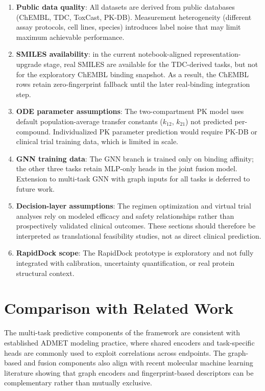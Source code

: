 \documentclass[a4paper,11pt,twoside]{report}
\begin{document}
\begin{enumerate}
  \item \textbf{Public data quality}: All datasets are derived from public databases (ChEMBL, TDC, ToxCast, PK-DB). Measurement heterogeneity (different assay protocols, cell lines, species) introduces label noise that may limit maximum achievable performance.
  \item \textbf{SMILES availability}: in the current notebook-aligned representation-upgrade stage, real SMILES are available for the TDC-derived tasks, but not for the exploratory ChEMBL binding snapshot. As a result, the ChEMBL rows retain zero-fingerprint fallback until the later real-binding integration step.
  \item \textbf{ODE parameter assumptions}: The two-compartment PK model uses default population-average transfer constants ($k_{12}$, $k_{21}$) not predicted per-compound. Individualized PK parameter prediction would require PK-DB or clinical trial training data, which is limited in scale.
  \item \textbf{GNN training data}: The GNN branch is trained only on binding affinity; the other three tasks retain MLP-only heads in the joint fusion model. Extension to multi-task GNN with graph inputs for all tasks is deferred to future work.
  \item \textbf{Decision-layer assumptions}: The regimen optimization and virtual trial analyses rely on modeled efficacy and safety relationships rather than prospectively validated clinical outcomes. These sections should therefore be interpreted as translational feasibility studies, not as direct clinical prediction.
  \item \textbf{RapidDock scope}: The RapidDock prototype is exploratory and not fully integrated with calibration, uncertainty quantification, or real protein structural context.
\end{enumerate}

\section{Comparison with Related Work}

The multi-task predictive components of the framework are consistent with established ADMET modeling practice, where shared encoders and task-specific heads are commonly used to exploit correlations across endpoints. The graph-based and fusion components also align with recent molecular machine learning literature showing that graph encoders and fingerprint-based descriptors can be complementary rather than mutually exclusive.
\end{document}
